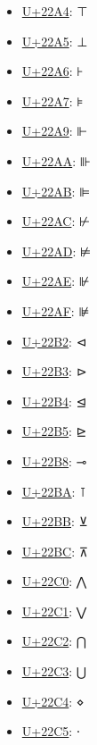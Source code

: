 \begin{itemize}
	\item \href{https://www.compart.com/en/unicode/U+22A4}{U+22A4}: ⊤
	\item \href{https://www.compart.com/en/unicode/U+22A5}{U+22A5}: ⊥
	\item \href{https://www.compart.com/en/unicode/U+22A6}{U+22A6}: ⊦
	\item \href{https://www.compart.com/en/unicode/U+22A7}{U+22A7}: ⊧
	\item \href{https://www.compart.com/en/unicode/U+22A9}{U+22A9}: ⊩
	\item \href{https://www.compart.com/en/unicode/U+22AA}{U+22AA}: ⊪
	\item \href{https://www.compart.com/en/unicode/U+22AB}{U+22AB}: ⊫
	\item \href{https://www.compart.com/en/unicode/U+22AC}{U+22AC}: ⊬
	\item \href{https://www.compart.com/en/unicode/U+22AD}{U+22AD}: ⊭
	\item \href{https://www.compart.com/en/unicode/U+22AE}{U+22AE}: ⊮
	\item \href{https://www.compart.com/en/unicode/U+22AF}{U+22AF}: ⊯
	\item \href{https://www.compart.com/en/unicode/U+22B2}{U+22B2}: ⊲
	\item \href{https://www.compart.com/en/unicode/U+22B3}{U+22B3}: ⊳
	\item \href{https://www.compart.com/en/unicode/U+22B4}{U+22B4}: ⊴
	\item \href{https://www.compart.com/en/unicode/U+22B5}{U+22B5}: ⊵
	\item \href{https://www.compart.com/en/unicode/U+22B8}{U+22B8}: ⊸
	\item \href{https://www.compart.com/en/unicode/U+22BA}{U+22BA}: ⊺
	\item \href{https://www.compart.com/en/unicode/U+22BB}{U+22BB}: ⊻
	\item \href{https://www.compart.com/en/unicode/U+22BC}{U+22BC}: ⊼
	\item \href{https://www.compart.com/en/unicode/U+22C0}{U+22C0}: ⋀
	\item \href{https://www.compart.com/en/unicode/U+22C1}{U+22C1}: ⋁
	\item \href{https://www.compart.com/en/unicode/U+22C2}{U+22C2}: ⋂
	\item \href{https://www.compart.com/en/unicode/U+22C3}{U+22C3}: ⋃
	\item \href{https://www.compart.com/en/unicode/U+22C4}{U+22C4}: ⋄
	\item \href{https://www.compart.com/en/unicode/U+22C5}{U+22C5}: ⋅

\end{itemize}
